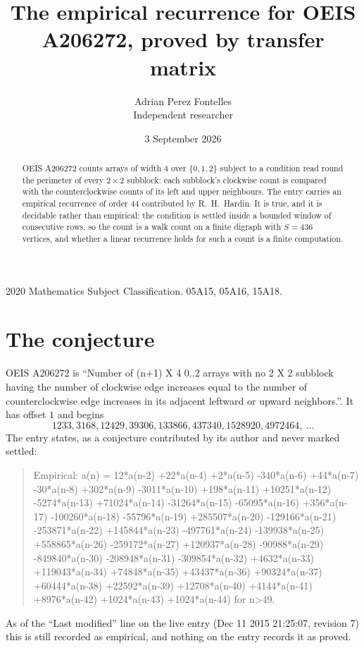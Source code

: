 \documentclass[11pt,a4paper]{article}
\title{The empirical recurrence for OEIS A206272, proved by transfer matrix}
\author{Adrian Perez Fontelles\\ \small Independent researcher}
\date{3 September 2026}
\theoremstyle{plain}
\theoremstyle{definition}
\begin{document}
\maketitle

\begin{abstract}
OEIS A206272 counts arrays of width $4$ over $\{0,1,2\}$ subject to a condition read round the
perimeter of every $2\times2$ subblock: each subblock's clockwise count is compared with the counterclockwise counts of its left and upper neighbours. The entry carries an empirical recurrence of
order $44$ contributed by R.~H.~Hardin. It is true, and it is decidable rather than
empirical: the condition is settled inside a bounded window of consecutive rows, so the
count is a walk count on a finite digraph with $S=436$ vertices, and whether a linear
recurrence holds for such a count is a finite computation.
\end{abstract}

\noindent\small 2020 Mathematics Subject Classification. 05A15, 05A16, 15A18.\normalsize

\section{The conjecture}

OEIS A206272 is ``Number of (n+1) X 4 0..2 arrays with no 2 X 2 subblock having the number of clockwise edge increases equal to the number of counterclockwise edge increases in its adjacent leftward or upward neighbors.''. It has offset $1$ and begins
\[
1233, 3168, 12429, 39306, 133866, 437340, 1528920, 4972464,\ \dots
\]
The entry states, as a conjecture contributed by its author and never marked settled:
\begin{quote}
Empirical: a(n) = 12*a(n-2) +22*a(n-4) +2*a(n-5) -340*a(n-6) +44*a(n-7) -30*a(n-8) +302*a(n-9) -3011*a(n-10) +198*a(n-11) +10251*a(n-12) -5274*a(n-13) +71024*a(n-14) -31264*a(n-15) -65095*a(n-16) +356*a(n-17) -100260*a(n-18) -55796*a(n-19) +285507*a(n-20) -129166*a(n-21) -253871*a(n-22) +145844*a(n-23) -497761*a(n-24) -139938*a(n-25) +558865*a(n-26) -259172*a(n-27) +120937*a(n-28) -90988*a(n-29) -849840*a(n-30) -208948*a(n-31) -309854*a(n-32) +4632*a(n-33) +119043*a(n-34) +74848*a(n-35) +43437*a(n-36) +90324*a(n-37) +60444*a(n-38) +22592*a(n-39) +12708*a(n-40) +4144*a(n-41) +8976*a(n-42) +1024*a(n-43) +1024*a(n-44) for n>49.
\end{quote}
As of the ``Last modified'' line on the live entry (Dec 11 2015 21:25:07, revision 7) this is still
recorded as empirical, and nothing on the entry records it as proved.
\end{document}
